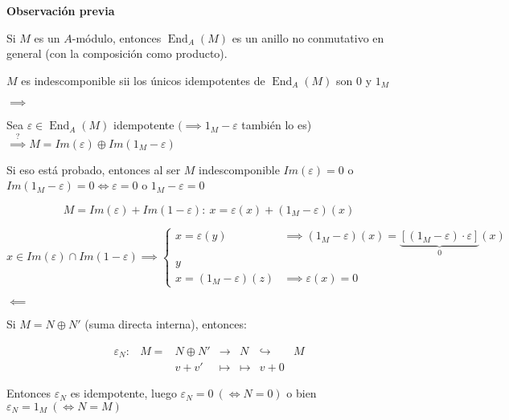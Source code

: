 \documentclass[openany]{book}
\begin{document}
\begin{flushright}
    \textbf{Observación previa}
\end{flushright}

    Si $ M$ es un $ A$-módulo, entonces $ \operatorname{End}_{A}(M)$ es un anillo no conmutativo en general (con la composición como producto).

\begin{proposition}
    $ M$ es indescomponible sii los únicos idempotentes de $ \operatorname{End}_{A}(M)$ son $ 0$ y $ 1_{M}$
\end{proposition}

\begin{demonstration}
    \noindent$ \implies$

    Sea $ \varepsilon \in \operatorname{End}_{A}(M)$ idempotente $ (\implies 1_{M}- \varepsilon$ también lo es) $ \stackrel{?}{\implies} M = Im(\varepsilon) \oplus Im(1_{M}-\varepsilon)$

    Si eso está probado, entonces al ser $ M$ indescomponible $ Im(\varepsilon) = 0$ o $ Im(1_{M}- \varepsilon) = 0 \iff \varepsilon = 0$ o $ 1_{M}-\varepsilon = 0$

    $$  M = Im(\varepsilon)+ Im(1-\varepsilon):\ x = \varepsilon(x) + (1_{M}-\varepsilon)(x) $$

    $$ x \in Im(\varepsilon) \cap Im(1-\varepsilon) \implies \left\{
    \begin{array}{ll}
        x = \varepsilon(y) & \implies (1_{M}-\varepsilon)(x) = \underbrace{[(1_{M}-\varepsilon)\cdot \varepsilon]}_{0}(x)\\ 
        y\\ 
        x = (1_{M}-\varepsilon)(z) & \implies \varepsilon(x) = 0
    \end{array}
    \right. $$

    \noindent $ \impliedby$

    Si $ M = N \oplus N'$ (suma directa interna), entonces:

    $$ 
    \begin{aligned}
        \varepsilon_{N}: & M = &   N \oplus N' & \to & N & \hookrightarrow & M\\ 
        & & v+v' & \mapsto & \mapsto & v+0
    \end{aligned}
    $$

    Entonces $ \varepsilon_{N}$ es idempotente, luego $ \varepsilon_{N} = 0\ (\iff N = 0)$ o bien $ \varepsilon_{N} = 1_{M}\ (\iff N = M)$

\end{demonstration}
\end{document}
